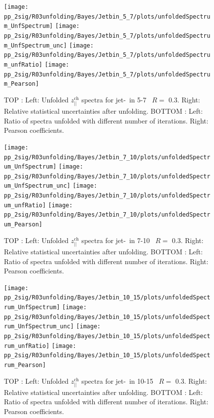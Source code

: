 \begin{figure}[bth]
\centering
\texttt{[image: pp\_2sig/R03unfolding/Bayes/Jetbin\_5\_7/plots/unfoldedSpectrum\_UnfSpectrum]}
\texttt{[image: pp\_2sig/R03unfolding/Bayes/Jetbin\_5\_7/plots/unfoldedSpectrum\_UnfSpectrum\_unc]}
\texttt{[image: pp\_2sig/R03unfolding/Bayes/Jetbin\_5\_7/plots/unfoldedSpectrum\_unfRatio]}
\texttt{[image: pp\_2sig/R03unfolding/Bayes/Jetbin\_5\_7/plots/unfoldedSpectrum\_Pearson]}
\caption{TOP : Left: Unfolded $z_{||}^\text{ch}$ spectra for jet-\pt\ in 5-7 \GeVc\, $R=$ 0.3. Right: Relative statistical uncertainties after unfolding.
BOTTOM : Left: Ratio of spectra unfolded with different number of iterations. Right: Pearson coefficients.
}
\label{fig:unf_R03_5_7}
\end{figure}


\begin{figure}[bth]
\centering
\texttt{[image: pp\_2sig/R03unfolding/Bayes/Jetbin\_7\_10/plots/unfoldedSpectrum\_UnfSpectrum]}
\texttt{[image: pp\_2sig/R03unfolding/Bayes/Jetbin\_7\_10/plots/unfoldedSpectrum\_UnfSpectrum\_unc]}
\texttt{[image: pp\_2sig/R03unfolding/Bayes/Jetbin\_7\_10/plots/unfoldedSpectrum\_unfRatio]}
\texttt{[image: pp\_2sig/R03unfolding/Bayes/Jetbin\_7\_10/plots/unfoldedSpectrum\_Pearson]}
\caption{TOP : Left: Unfolded $z_{||}^\text{ch}$ spectra for jet-\pt\ in 7-10 \GeVc\, $R=$ 0.3. Right: Relative statistical uncertainties after unfolding.
BOTTOM : Left: Ratio of spectra unfolded with different number of iterations. Right: Pearson coefficients.
}
\label{fig:unf_R03_7_10}
\end{figure}

\begin{figure}[bth]
\centering
\texttt{[image: pp\_2sig/R03unfolding/Bayes/Jetbin\_10\_15/plots/unfoldedSpectrum\_UnfSpectrum]}
\texttt{[image: pp\_2sig/R03unfolding/Bayes/Jetbin\_10\_15/plots/unfoldedSpectrum\_UnfSpectrum\_unc]}
\texttt{[image: pp\_2sig/R03unfolding/Bayes/Jetbin\_10\_15/plots/unfoldedSpectrum\_unfRatio]}
\texttt{[image: pp\_2sig/R03unfolding/Bayes/Jetbin\_10\_15/plots/unfoldedSpectrum\_Pearson]}
\caption{TOP : Left: Unfolded $z_{||}^\text{ch}$ spectra for jet-\pt\ in 10-15 \GeVc\, $R=$ 0.3. Right: Relative statistical uncertainties after unfolding.
BOTTOM : Left: Ratio of spectra unfolded with different number of iterations. Right: Pearson coefficients.
}
\label{fig:unf_R03_10_15}
\end{figure}

